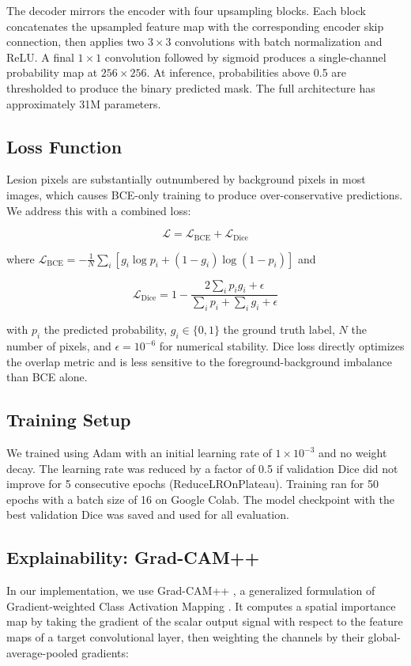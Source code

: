 \documentclass[10pt,journal,compsoc]{IEEEtran}
\begin{document}
The decoder mirrors the encoder with four upsampling blocks. Each block concatenates the upsampled feature map with the corresponding encoder skip connection, then applies two $3 \times 3$ convolutions with batch normalization and ReLU. A final $1 \times 1$ convolution followed by sigmoid produces a single-channel probability map at $256 \times 256$. At inference, probabilities above 0.5 are thresholded to produce the binary predicted mask. The full architecture has approximately 31M parameters.

\subsection{Loss Function}
Lesion pixels are substantially outnumbered by background pixels in most images, which causes BCE-only training to produce over-conservative predictions. We address this with a combined loss:

\begin{equation}
\mathcal{L} = \mathcal{L}_{\text{BCE}} + \mathcal{L}_{\text{Dice}}
\end{equation}

where $\mathcal{L}_{\text{BCE}} = -\frac{1}{N}\sum_{i}[g_i \log p_i + (1-g_i)\log(1-p_i)]$ and

\begin{equation}
\mathcal{L}_{\text{Dice}} = 1 - \frac{2\sum_i p_i g_i + \epsilon}{\sum_i p_i + \sum_i g_i + \epsilon}
\end{equation}

with $p_i$ the predicted probability, $g_i \in \{0,1\}$ the ground truth label, $N$ the number of pixels, and $\epsilon = 10^{-6}$ for numerical stability. Dice loss directly optimizes the overlap metric and is less sensitive to the foreground-background imbalance than BCE alone.

\subsection{Training Setup}
We trained using Adam with an initial learning rate of $1 \times 10^{-3}$ and no weight decay. The learning rate was reduced by a factor of 0.5 if validation Dice did not improve for 5 consecutive epochs (ReduceLROnPlateau). Training ran for 50 epochs with a batch size of 16 on Google Colab. The model checkpoint with the best validation Dice was saved and used for all evaluation.

\subsection{Explainability: Grad-CAM++}
In our implementation, we use Grad-CAM++ \cite{gradcampp}, a generalized formulation of Gradient-weighted Class Activation Mapping \cite{gradcam}. It computes a spatial importance map by taking the gradient of the scalar output signal with respect to the feature maps of a target convolutional layer, then weighting the channels by their global-average-pooled gradients:
\end{document}
